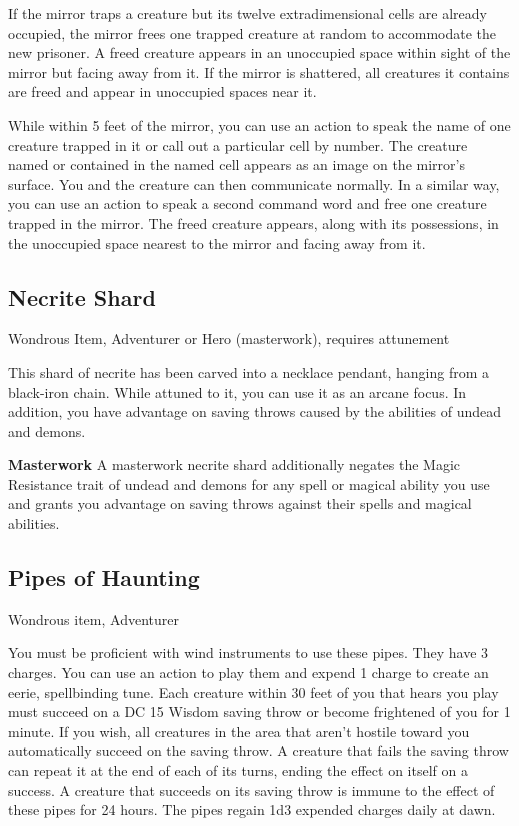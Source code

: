 If the mirror traps a creature but its twelve extradimensional cells are already occupied, the mirror frees one trapped creature at random to accommodate the new prisoner. A freed creature appears in an unoccupied space within sight of the mirror but facing away from it. If the mirror is shattered, all creatures it contains are freed and appear in unoccupied spaces near it.

While within 5 feet of the mirror, you can use an action to speak the name of one creature trapped in it or call out a particular cell by number. The creature named or contained in the named cell appears as an image on the mirror's surface. You and the creature can then communicate normally.
In a similar way, you can use an action to speak a second command word and free one creature trapped in the mirror. The freed creature appears, along with its possessions, in the unoccupied space nearest to the mirror and facing away from it.

\subsection{Necrite Shard}
Wondrous Item, Adventurer or Hero (masterwork), requires attunement

This shard of necrite has been carved into a necklace pendant, hanging from a black-iron chain. While attuned to it, you can use it as an arcane focus. In addition, you have advantage on saving throws caused by the abilities of undead and demons.

\textbf{Masterwork} A masterwork necrite shard additionally negates the Magic Resistance trait of undead and demons for any spell or magical ability you use and grants you advantage on saving throws against their spells and magical abilities.

\subsection{Pipes of Haunting}
Wondrous item, Adventurer

You must be proficient with wind instruments to use these pipes. They have 3 charges. You can use an action to play them and expend 1 charge to create an eerie, spellbinding tune. Each creature within 30 feet of you that hears you play must succeed on a DC 15 Wisdom saving throw or become frightened of you for 1 minute. If you wish, all creatures in the area that aren't hostile toward you automatically succeed on the saving throw. A creature that fails the saving throw can repeat it at the end of each of its turns, ending the effect on itself on a success. A creature that succeeds on its saving throw is immune to the effect of these pipes for 24 hours. The pipes regain 1d3 expended charges daily at dawn.

